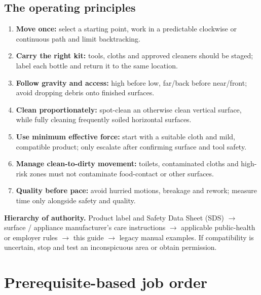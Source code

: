 \documentclass[10pt,letterpaper,oneside]{article}
\begin{document}
\subsection{The operating principles}
\begin{enumerate}
\item \textbf{Move once:} select a starting point, work in a predictable clockwise or continuous path and limit backtracking.
\item \textbf{Carry the right kit:} tools, cloths and approved cleaners should be staged; label each bottle and return it to the same location.
\item \textbf{Follow gravity and access:} high before low, far/back before near/front; avoid dropping debris onto finished surfaces.
\item \textbf{Clean proportionately:} spot-clean an otherwise clean vertical surface, while fully cleaning frequently soiled horizontal surfaces.
\item \textbf{Use minimum effective force:} start with a suitable cloth and mild, compatible product; only escalate after confirming surface and tool safety.
\item \textbf{Manage clean-to-dirty movement:} toilets, contaminated cloths and high-risk zones must not contaminate food-contact or other surfaces.
\item \textbf{Quality before pace:} avoid hurried motions, breakage and rework; measure time only alongside safety and quality.
\end{enumerate}
\begin{safetybox}\textbf{Hierarchy of authority.} Product label and Safety Data Sheet (SDS) \(\rightarrow\) surface / appliance manufacturer's care instructions \(\rightarrow\) applicable public-health or employer rules \(\rightarrow\) this guide \(\rightarrow\) legacy manual examples. If compatibility is uncertain, stop and test an inconspicuous area or obtain permission.\end{safetybox}

\section{Prerequisite-based job order}
\end{document}

